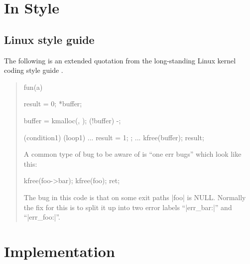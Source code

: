 \documentclass[10pt]{amsart}
\begin{document}

\appendix

\section{In Style}

\subsection{Linux style guide}
\label{sec:linuxstyle}%

The following is an extended quotation from the long-standing Linux
kernel coding style guide \cite{LinuxStyle42}.
\begin{quotation}
\begin{offside}
  \begin{CVerbatim}
        \ctype[int] fun(\ctype[int] a)
        {
                \ctype[int] result = 0;
                \ctype[char] *buffer;

                buffer = kmalloc(\ccaps[SIZE], );
                \ckw[if] (!buffer)
                        \ckw[return] -\ccaps[ENOMEM];

                \ckw[if] (condition1) {
                        \ckw[while] (loop1) {
                                ...
                        }
                        result = 1;
                        \ckw[goto] ;
                }
                ...
                kfree(buffer);
                \ckw[return] result;
        }
\end{CVerbatim}
\noindent
A common type of bug to be aware of is ``one err bugs'' which look
like this:
\begin{CVerbatim}
        \clab[err:]
                kfree(foo->bar);
                kfree(foo);
                \ckw[return] ret;
\end{CVerbatim}
The bug in this code is that on some exit paths |foo| is NULL.
Normally the fix for this is to split it up into two error labels
``\intextclab|err_bar:|'' and ``\intextclab|err_foo:|''.
%
\end{offside}
\end{quotation}

\section{Implementation}
\end{document}
